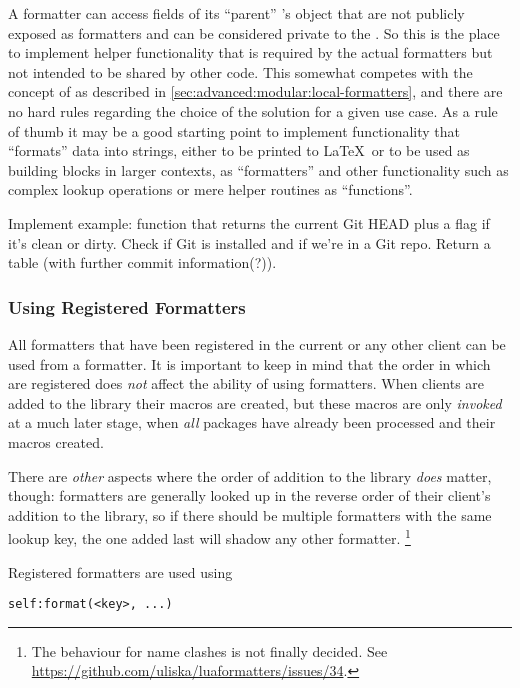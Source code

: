 \documentclass[12pt]{scrartcl}
\begin{document}
A formatter can access fields of its “parent” 's
 object that are not publicly exposed as formatters and
can be considered private to the . So this is the place to
implement helper functionality that is required by the actual formatters but not
intended to be shared by other code.  This somewhat competes with the concept of
 as described in
\vref{sec:advanced:modular:local-formatters}, and there are no hard rules
regarding the choice of the solution for a given use case.  As a rule of thumb it may be a good starting point to implement functionality that “formats” data into strings, either to be printed to \LaTeX\ or to be used as building blocks in larger contexts, as “formatters” and other functionality such as complex lookup operations or mere helper routines as “functions”.

 Implement example: function that returns the current Git HEAD plus a flag if it's clean or dirty. Check if Git is installed and if we're in a Git repo. Return a table (with further commit information(?)).



\subsubsection{Using Registered Formatters}
\label{sec:advanced:modular:formatters}

All formatters that have been registered in the current or any other client can
be used from a formatter.  It is important to keep in mind that the order in
which  are registered does \emph{not} affect the ability
of using formatters.  When clients are added to the library their macros are
created, but these macros are only \emph{invoked} at a much later stage, when
\emph{all} packages have already been processed and their macros created.

There are \emph{other} aspects where the order of addition to the library
\emph{does} matter, though:  formatters are generally looked up in the reverse
order of their client's addition to the library, so if there should be multiple
formatters with the same lookup key, the one added last will shadow any other
formatter.%
\footnote{ The behaviour for name clashes is not finally decided.
See \url{https://github.com/uliska/luaformatters/issues/34}.}

Registered formatters are used using

\begin{verbatim}
self:format(<key>, ...)
\end{verbatim}
\end{document}
